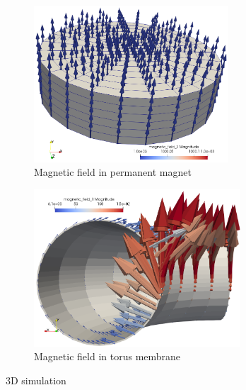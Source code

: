 \documentclass[11pt,a4paper,final]{article}
\begin{document}
\begin{figure}[h]
\centering
\begin{subfigure}{0.49\textwidth}
\centering
\includegraphics[width=0.8\textwidth]{3d_1quar_magnet_field.png}
\caption{Magnetic field in permanent magnet}
\label{fig:1.7.1}
\end{subfigure}
\begin{subfigure}{0.49\textwidth}
\centering
\includegraphics[width=0.85\textwidth]{3d_1quar_toroid_field_2.png}
\caption{Magnetic field in torus membrane}
\label{fig:1.7.2}
\end{subfigure}
\caption{3D simulation}
\label{fig:1.7}
\end{figure}

\newpage
\printbibliography
\end{document}
